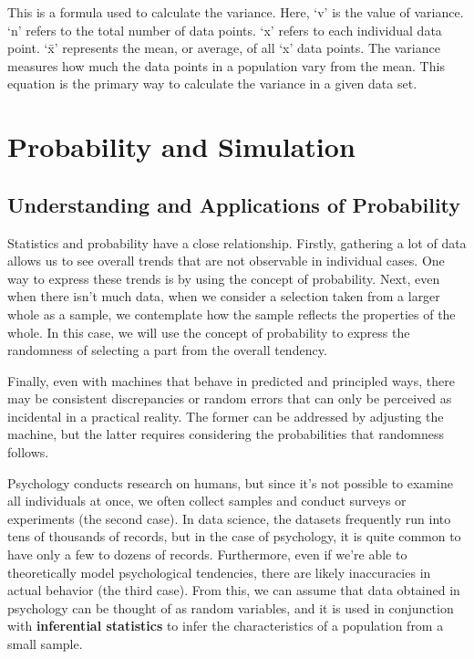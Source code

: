 \documentclass[
  a4paper,
]{book}
\begin{document}
This is a formula used to calculate the variance. Here, `v' is the value
of variance. `n' refers to the total number of data points. `x' refers
to each individual data point. `x̄' represents the mean, or average, of
all `x' data points. The variance measures how much the data points in a
population vary from the mean. This equation is the primary way to
calculate the variance in a given data set.


\chapter{Probability and Simulation}\label{probability-and-simulation}

\section{Understanding and Applications of
Probability}\label{understanding-and-applications-of-probability}

Statistics and probability have a close relationship. Firstly, gathering
a lot of data allows us to see overall trends that are not observable in
individual cases. One way to express these trends is by using the
concept of probability. Next, even when there isn't much data, when we
consider a selection taken from a larger whole as a sample, we
contemplate how the sample reflects the properties of the whole. In this
case, we will use the concept of probability to express the randomness
of selecting a part from the overall tendency.

Finally, even with machines that behave in predicted and principled
ways, there may be consistent discrepancies or random errors that can
only be perceived as incidental in a practical reality. The former can
be addressed by adjusting the machine, but the latter requires
considering the probabilities that randomness follows.

Psychology conducts research on humans, but since it's not possible to
examine all individuals at once, we often collect samples and conduct
surveys or experiments (the second case). In data science, the datasets
frequently run into tens of thousands of records, but in the case of
psychology, it is quite common to have only a few to dozens of records.
Furthermore, even if we're able to theoretically model psychological
tendencies, there are likely inaccuracies in actual behavior (the third
case). From this, we can assume that data obtained in psychology can be
thought of as random variables, and it is used in conjunction with
\textbf{inferential statistics} to infer the characteristics of a
population from a small sample.
\end{document}
